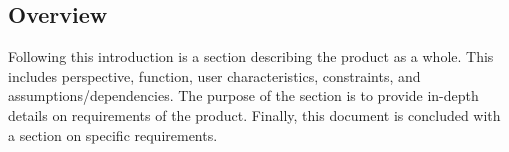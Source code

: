         \subsection{Overview}
        Following this introduction is a section describing the product as a whole. This includes perspective, function, user characteristics, constraints, and assumptions/dependencies. The purpose of the section is to provide in-depth details on requirements of the product. Finally, this document is concluded with a section on specific requirements.
    